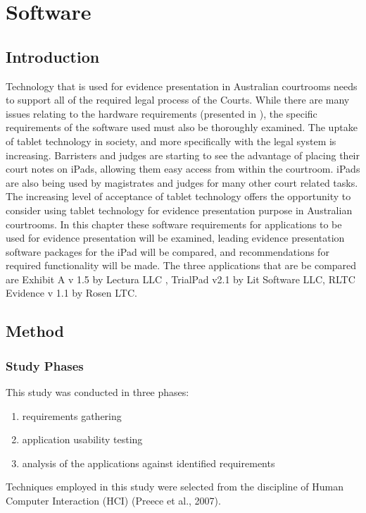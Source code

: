 


\chapter{Software\label{chap:Software}}





\section{Introduction}
\doublespace
Technology that is used for evidence presentation in Australian courtrooms needs to support all of the required legal process of the Courts. While there are many issues relating to the hardware requirements (presented in 
), the specific requirements of the software used must also be thoroughly examined. The uptake of tablet technology in society, and more specifically with the legal system is increasing.
Barristers and judges are starting to see the advantage of placing their court notes on iPads, allowing them easy access from within the courtroom. iPads are also being used by magistrates and judges for many other court related tasks. The increasing level of acceptance of tablet technology offers the opportunity to consider using tablet technology for evidence presentation purpose in Australian courtrooms.
In this chapter these software requirements for applications to be used for evidence presentation will be examined, leading evidence presentation software packages for the iPad will be compared, and recommendations for required functionality will be made.
The three applications that are be compared are Exhibit A v 1.5 by Lectura LLC ,  TrialPad v2.1 by Lit Software LLC, RLTC Evidence v 1.1 by Rosen LTC.


\section{Method}
\subsection{Study Phases}
This study was conducted in three phases:
\begin{enumerate}
    \item requirements gathering
    \item application usability testing
    \item analysis of the applications against identified requirements
\end{enumerate} 
Techniques employed in this study were selected from the discipline of Human Computer Interaction (HCI) \color{green}(Preece et al., 2007).
\color{black}
